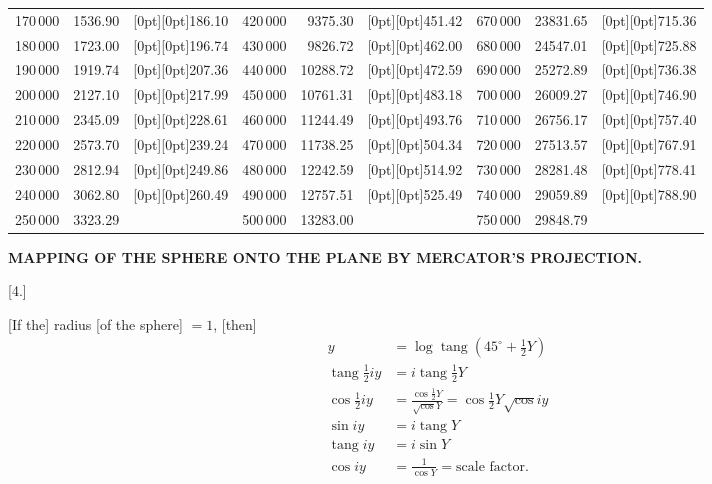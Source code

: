 {{\begin{tabular}{|r|r|r||r|r|r||r|r|r|}
170\,000 & 1536.90 & \raisebox{-6.7pt}[0pt][0pt]{186.10} & 420\,000 & 9375.30 & \raisebox{-6.7pt}[0pt][0pt]{451.42} & 670\,000 & 23831.65 & \raisebox{-6.7pt}[0pt][0pt]{715.36} \\
180\,000 & 1723.00 & \raisebox{-6.7pt}[0pt][0pt]{196.74} & 430\,000 & 9826.72 & \raisebox{-6.7pt}[0pt][0pt]{462.00} & 680\,000 & 24547.01 & \raisebox{-6.7pt}[0pt][0pt]{725.88} \\
190\,000 & 1919.74 & \raisebox{-6.7pt}[0pt][0pt]{207.36} & 440\,000 & 10288.72 & \raisebox{-6.7pt}[0pt][0pt]{472.59} & 690\,000 & 25272.89 & \raisebox{-6.7pt}[0pt][0pt]{736.38} \\
200\,000 & 2127.10 & \raisebox{-6.7pt}[0pt][0pt]{217.99} & 450\,000 & 10761.31 & \raisebox{-6.7pt}[0pt][0pt]{483.18} & 700\,000 & 26009.27 & \raisebox{-6.7pt}[0pt][0pt]{746.90} \\
\cline{1-2}\cline{4-5}\cline{7-8}
210\,000 & 2345.09\llap{\raisebox{-.85ex}[0pt][0pt]{.}} & \raisebox{-6.7pt}[0pt][0pt]{228.61} & 460\,000 & 11244.49 & \raisebox{-6.7pt}[0pt][0pt]{493.76} & 710\,000 & 26756.17 & \raisebox{-6.7pt}[0pt][0pt]{757.40} \\
220\,000 & 2573.70 & \raisebox{-6.7pt}[0pt][0pt]{239.24} & 470\,000 & 11738.25 & \raisebox{-6.7pt}[0pt][0pt]{504.34} & 720\,000 & 27513.57 & \raisebox{-6.7pt}[0pt][0pt]{767.91} \\
230\,000 & 2812.94 & \raisebox{-6.7pt}[0pt][0pt]{249.86} & 480\,000 & 12242.59 & \raisebox{-6.7pt}[0pt][0pt]{514.92} & 730\,000 & 28281.48 & \raisebox{-6.7pt}[0pt][0pt]{778.41} \\
240\,000 & 3062.80 & \raisebox{-6.7pt}[0pt][0pt]{260.49} & 490\,000 & 12757.51 & \raisebox{-6.7pt}[0pt][0pt]{525.49} & 740\,000 & 29059.89 & \raisebox{-6.7pt}[0pt][0pt]{788.90} \\
250\,000 & 3323.29 &  & 500\,000 & 13283.00 &  & 750\,000 & 29848.79 &  \\
\end{tabular}%
}\par}
\par\clearpage
\noindent\null\hfill{\fontsize{8}{10}\selectfont\textbf{MAPPING OF THE SPHERE ONTO THE PLANE BY MERCATOR'S PROJECTION.}}\hfill{}\par\medskip

\begin{center}[4.]\end{center}
[If the] radius [of the sphere] \(=1\), [then]
\[
\begin{aligned}
y&=\log\operatorname{tang}(45^\circ+\tfrac12Y)\\
\operatorname{tang}\tfrac12iy&=i\operatorname{tang}\tfrac12Y\\
\cos\tfrac12iy&=\frac{\cos\tfrac12Y}{\surd\cos Y}=\cos\tfrac12Y\surd\cos iy\\
\sin iy&=i\operatorname{tang}Y\\
\operatorname{tang}iy&=i\sin Y\\
\cos iy&=\frac1{\cos Y}=\text{scale factor.}
\end{aligned}
\]

